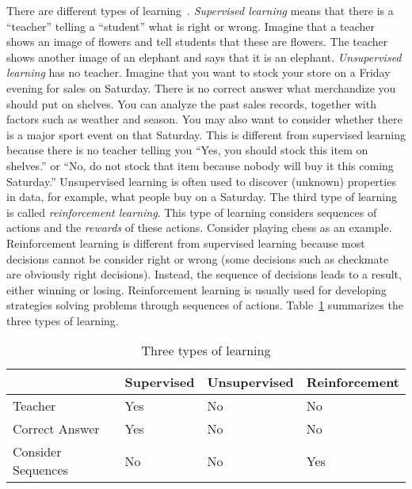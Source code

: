 
There are different types of
learning~\cite{Goodfellow2016DeepLearning,
  Sutton2017ReinforcementLearningIntroduction}.  {\it Supervised
  learning} means that there is a ``teacher'' telling a ``student''
what is right or wrong. Imagine that a teacher shows an image of
flowers and tell students that these are flowers. The teacher shows
another image of an elephant and says that it is an elephant.  {\it
  Unsupervised learning} has no teacher. Imagine that you want to
stock your store on a Friday evening for sales on Saturday.  There is
no correct answer what merchandize you should put on shelves.  You can
analyze the past sales records, together with factors such as weather
and season.  You may also want to consider whether there is a major
sport event on that Saturday.  This is different from supervised
learning because there is no teacher telling you ``Yes, you should
stock this item on shelves.''  or ``No, do not stock that item because
nobody will buy it this coming Saturday.''  Unsupervised learning is
often used to discover (unknown) properties in data, for example, what
people buy on a Saturday.  The third type of learning is called {\it
  reinforcement learning}.  This type of learning considers sequences
of actions and the {\it rewards} of these actions.  Consider playing
chess as an example.  Reinforcement learning is different from
supervised learning because most decisions cannot be consider right or
wrong (some decisions such as checkmate are obviously right
decisions). Instead, the sequence of decisions leads to a result,
either winning or losing. Reinforcement learning is usually used for
developing strategies solving problems through sequences of actions.
Table~\ref{table:threetypesoflearning} summarizes the three types of
learning.

\vspace{0.1in}
\begin{table}
  \begin{tabular}{p{1.2in}p{1.2in}p{1.2in}p{1.2in}}
    &    {\bf Supervised} & {\bf Unsupervised} & {\bf Reinforcement} \\
    \hline
    Teacher & Yes & No & No \\
    Correct Answer & Yes & No & No \\
    Consider Sequences & No & No & Yes \\
  \end{tabular}
  \caption{Three types of learning}
  \label{table:threetypesoflearning}
\end{table}
\vspace{0.1in}

